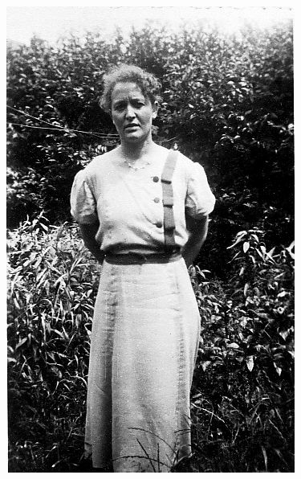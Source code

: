\documentclass[12pt,twoside, openright]{memoir}
\begin{document}
\begin{figure}
\centering
\includegraphics[width=\textwidth]{img/29moe}
\caption*{\footnotesize }
\end{figure}
\end{document}
